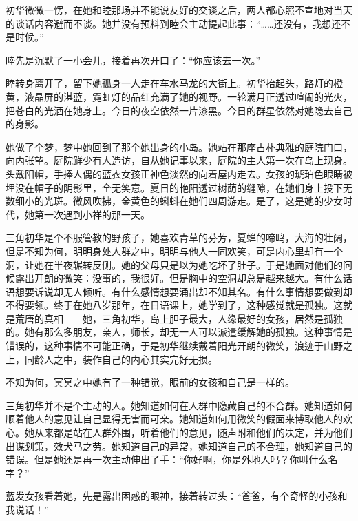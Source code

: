 \documentclass{article}
\begin{document}
初华微微一愣，在她和睦那场并不能说友好的交谈之后，两人都心照不宣地对当天的谈话内容避而不谈。她并没有预料到睦会主动提起此事：“……还没有，我想还不是时候。”



睦先是沉默了一小会儿，接着再次开口了：“你应该去一次。”



睦转身离开了，留下她孤身一人走在车水马龙的大街上。初华抬起头，路灯的橙黄，液晶屏的湛蓝，霓虹灯的品红充满了她的视野。一轮满月正透过喧闹的光火，把苍白的光洒在她身上。今日的夜空依然一片漆黑。今日的群星依然对她隐去自己的身影。



她做了个梦，梦中她回到了那个她出身的小岛。她站在那座古朴典雅的庭院门口，向内张望。庭院鲜少有人造访，自从她记事以来，庭院的主人第一次在岛上现身。头戴阳帽，手捧人偶的蓝衣女孩正神色淡然的向着屋内走去。女孩的琥珀色眼睛被埋没在帽子的阴影里，全无笑意。夏日的艳阳透过树荫的缝隙，在她们身上投下无数细小的光斑。微风吹拂，金黄色的蝌蚪在她们四周游走。是了，这是她的少女时代，她第一次遇到小祥的那一天。



三角初华是个不服管教的野孩子，她喜欢青草的芬芳，夏蝉的啼鸣，大海的壮阔，但是不知为何，明明身处人群之中，明明与他人一同欢笑，可是内心里却有一个洞，让她在半夜辗转反侧。她的父母只是以为她吃坏了肚子。于是她面对他们的问候露出开朗的微笑：没事的，我很好。但是胸中的空洞却总是越来越大。有什么话语想要诉说却无人倾听。有什么感情想要涌出却不知其名。有什么事情想要做到却不得要领。终于在她八岁那年，在日语课上，她学到了，这种感觉就是孤独。这就是荒唐的真相——她，三角初华，岛上胆子最大，人缘最好的女孩，居然是孤独的。她有那么多朋友，亲人，师长，却无一人可以派遣缓解她的孤独。这种事情是错误的，这种事情不可能正确，于是初华继续戴着阳光开朗的微笑，浪迹于山野之上，同龄人之中，装作自己的内心其实完好无损。



不知为何，冥冥之中她有了一种错觉，眼前的女孩和自己是一样的。



三角初华并不是个主动的人。她知道如何在人群中隐藏自己的不合群。她知道如何顺着他人的意见让自己显得无害而可亲。她知道如何用微笑的假面来博取他人的欢心。她从来都是站在人群外围，听着他们的意见，随声附和他们的决定，并为他们出谋划策，效犬马之劳。她知道自己的异常，她知道自己的不合理，她知道自己的错误。但是她还是再一次主动伸出了手：“你好啊，你是外地人吗？你叫什么名字？”



蓝发女孩看着她，先是露出困惑的眼神，接着转过头：“爸爸，有个奇怪的小孩和我说话！”
\end{document}
